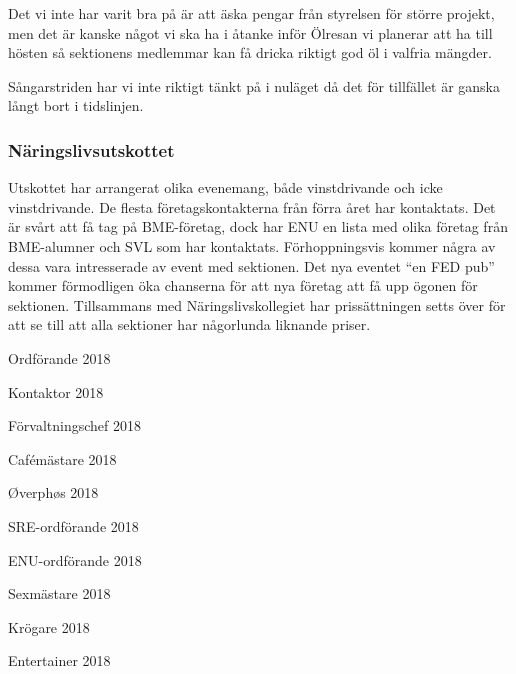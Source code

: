 \documentclass[../_main/handlingar.tex]{subfiles}
\begin{document}
Det vi inte har varit bra på är att äska pengar från styrelsen för större projekt, men det är kanske något vi ska ha i åtanke inför Ölresan vi planerar att ha till hösten så sektionens medlemmar kan få dricka riktigt god öl i valfria mängder. 

Sångarstriden har vi inte riktigt tänkt på i nuläget då det för tillfället är ganska långt bort i tidslinjen. 

\subsubsection*{Näringslivsutskottet}
Utskottet har arrangerat olika evenemang, både vinstdrivande och icke vinstdrivande. De flesta företagskontakterna från förra året har kontaktats. Det är svårt att få tag på BME-företag, dock har ENU en lista med olika företag från BME-alumner och SVL som har kontaktats. Förhoppningsvis kommer några av dessa vara intresserade av event med sektionen. Det nya eventet “en FED pub” kommer förmodligen öka chanserna för att nya företag att få upp ögonen för sektionen.
Tillsammans med Näringslivskollegiet har prissättningen setts över för att se till att alla sektioner har någorlunda liknande priser.

\newpage
\begin{signatures}{10}
    \mvh
    \signature{Daniel Bakic}{Ordförande 2018}
    \signature{Axel Voss}{Kontaktor 2018}
    \signature{Magnus Lundh}{Förvaltningschef 2018}
    \signature{Elin Johansson}{Cafémästare 2018}
    \signature{Andreas Bennström}{Øverphøs 2018}
    \signature{Fanny Månefjord}{SRE-ordförande 2018}
    \signature{Isabella Hansen}{ENU-ordförande 2018}
    \signature{Alexander Wik}{Sexmästare 2018}
    \signature{Malin Heyden}{Krögare 2018}
    \signature{Adam Belfrage}{Entertainer 2018}
\end{signatures}
\end{document}
